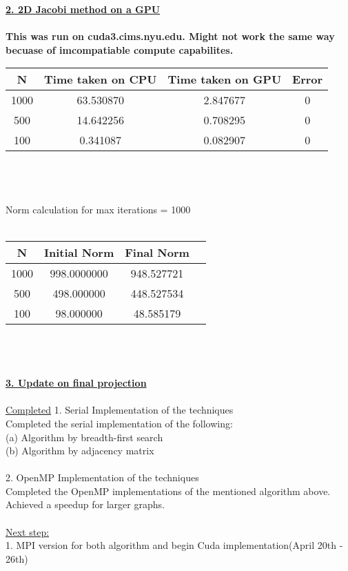 \documentclass[12pt,letterpaper]{article}
\begin{document}
\underline{\textbf{2. 2D Jacobi method on a GPU}} \\\\


\textbf{This was run on cuda3.cims.nyu.edu. Might not work the same way becuase of imcompatiable compute capabilites. }\\


\begin{tabular}{ |c|c|c|c| } 
 \hline
N &Time taken on CPU&Time taken on GPU&Error \\
 \hline\hline
 1000 & 63.530870 & 2.847677 & 0  \\
 \hline
500 & 14.642256 &0.708295 & 0  \\
\hline
100 & 0.341087 &  0.082907  & 0  \\
\hline

\end{tabular} \\\\\\

Norm calculation for max iterations = 1000 \\\\
\begin{tabular}{ |c|c|c|c| } 
 \hline
N &Initial Norm & Final Norm  \\
 \hline\hline
 1000 & 998.0000000 &  948.527721  \\
 \hline
500 & 498.000000 &  448.527534 \\
\hline
100 & 98.000000 &  48.585179  \\
\hline

\end{tabular} \\\\\\
\underline{\textbf{3. Update on final projection}} \\\\
\underline{Completed}
1. Serial Implementation of the techniques \\
Completed the serial implementation of the following:\\
(a) Algorithm by breadth-first search\\ (b) Algorithm by adjacency matrix\\\\
2. OpenMP Implementation of the techniques \\
Completed the OpenMP implementations of the mentioned algorithm above. \\
Achieved a speedup for larger graphs. \\\\
\underline{Next step:}\\
1. MPI version for both algorithm and begin Cuda implementation(April 20th - 26th)\\
\end{document}
